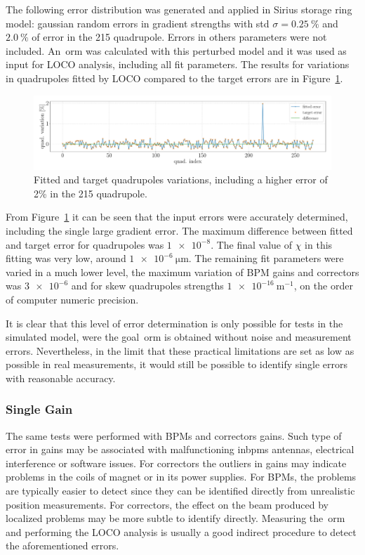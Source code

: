 The following error distribution was generated and applied in Sirius storage ring model: gaussian random errors in gradient strengths with std $\sigma=\SI{0.25}{\%}$ and $\SI{2.0}{\%}$ of error in the 215 quadrupole. Errors in others parameters were not included. An~\gls{orm} was calculated with this perturbed model and it was used as input for LOCO analysis, including all fit parameters. The results for variations in quadrupoles fitted by LOCO compared to the target errors are in Figure~\ref{fig:single_quad_detec}.
\begin{figure}[h!]
\centering
\includegraphics[width=1.0\textwidth]{figures/single_quaderror_detection_big.pdf}
\caption{Fitted and target quadrupoles variations, including a higher error of 2\% in the 215 quadrupole.}
\label{fig:single_quad_detec}
\end{figure}

From Figure~\ref{fig:single_quad_detec} it can be seen that the input errors were accurately determined, including the single large gradient error. The maximum difference between fitted and target error for quadrupoles was $\num{1e-8}$. The final value of $\chi$ in this fitting was very low, around $\SI{1e-6}{\micro\meter}$. The remaining fit parameters were varied in a much lower level, the maximum variation of BPM gains and correctors was $\num{3e-6}$ and for skew quadrupoles strengths $\SI{1e-16}{\meter^{-1}}$, on the order of computer numeric precision.

It is clear that this level of error determination is only possible for tests in the simulated model, were the goal~\gls{orm} is obtained without noise and measurement errors. Nevertheless, in the limit that these practical limitations are set as low as possible in real measurements, it would still be possible to identify single errors with reasonable accuracy.
\subsubsection{Single Gain}
The same tests were performed with BPMs and correctors gains. Such type of error in gains may be associated with malfunctioning in\glspl{bpm} antennas, electrical interference or software issues. For correctors the outliers in gains may indicate problems in the coils of magnet or in its power supplies. For BPMs, the problems are typically easier to detect since they can be identified directly from unrealistic position measurements. For correctors, the effect on the beam produced by localized problems may be more subtle to identify directly. Measuring the~\gls{orm} and performing the LOCO analysis is usually a good indirect procedure to detect the aforementioned errors.

